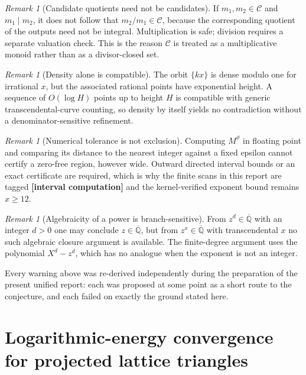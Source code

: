 \documentclass[11pt,oneside]{article}
\theoremstyle{definition}
\theoremstyle{remark}
\newtheorem{remark}[theorem]{Remark}
\newcommand{\Abar}{\overline{\mathbb Q}}
\newcommand{\thetaq}{\vartheta}
\newcommand{\Cand}{\mathcal C}
\newcommand{\Qbar}{\Abar}
\newcommand{\statuscomp}{\textcolor{computeviolet}{\textbf{[interval computation]}}}
\begin{document}
\begin{remark}[Candidate quotients need not be candidates]
\label{a4:warn-quotient}
If $m_1,m_2\in\Cand$ and $m_1\mid m_2$, it does not follow that $m_2/m_1\in\Cand$, because
the corresponding quotient of the outputs need not be integral.  Multiplication is safe;
division requires a separate valuation check.  This is the reason $\Cand$ is treated as a
multiplicative monoid rather than as a divisor-closed set.
\end{remark}

\begin{remark}[Density alone is compatible]
\label{a4:warn-density}
The orbit $\{kx\}$ is dense modulo one for irrational $x$, but the associated rational points
have exponential height.  A sequence of $O(\log H)$ points up to height $H$ is compatible
with generic transcendental-curve counting, so density by itself yields no contradiction
without a denominator-sensitive refinement.
\end{remark}

\begin{remark}[Numerical tolerance is not exclusion]
\label{a4:warn-tolerance}
Computing $M^{\thetaq}$ in floating point and comparing its distance to the nearest integer
against a fixed epsilon cannot certify a zero-free region, however wide.  Outward directed
interval bounds or an exact certificate are required, which is why the finite scans in this
report are tagged \statuscomp{} and the kernel-verified exponent bound remains $x\ge12$.
\end{remark}

\begin{remark}[Algebraicity of a power is branch-sensitive]
\label{a4:warn-branch}
From $z^{d}\in\Qbar$ with an integer $d>0$ one may conclude $z\in\Qbar$, but from
$z^{x}\in\Qbar$ with transcendental $x$ no such algebraic closure argument is available.  The
finite-degree argument uses the polynomial $X^{d}-z^{d}$, which has no analogue when the
exponent is not an integer.
\end{remark}

Every warning above was re-derived independently during the preparation of the present
unified report: each was proposed at some point as a short route to the conjecture, and each
failed on exactly the ground stated here.



\section{Logarithmic-energy convergence for projected lattice triangles}
\label{app:energy-convergence}
\end{document}
